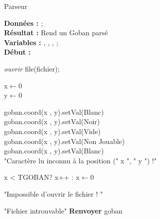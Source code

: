         \begin{algorithme}
            \caption{Parseur}
            \textbf{Données :}
            ;\\
            \textbf{Résultat :} Rend un Goban parsé\\
            \textbf{Variables :}   
            ,
            ,
            ,
            ;\\
            \textbf{Début :}\\
            {\textit{ouvrir} file(fichier);\\
                {x$\leftarrow$0\\
                y$\leftarrow$0\\
                {
                    {goban.coord(x , y).setVal(Blanc)}\\
                    {goban.coord(x , y).setVal(Noir)}\\
                    {goban.coord(x , y).setVal(Vide)}\\
                    {goban.coord(x , y).setVal(Non Jouable)}\\
                    {goban.coord(x , y).setVal(Blanc)}\\
                {"Caractère lu inconnu à la position (" x ", " y ") !"}
                
                x < TGOBAN? x++ : x$\leftarrow$0\\}
            }
                {"Impossible d'ouvrir le fichier ! "}
            }{"Fichier introuvable"}
            \textbf{Renvoyer} goban
        \end{algorithme}